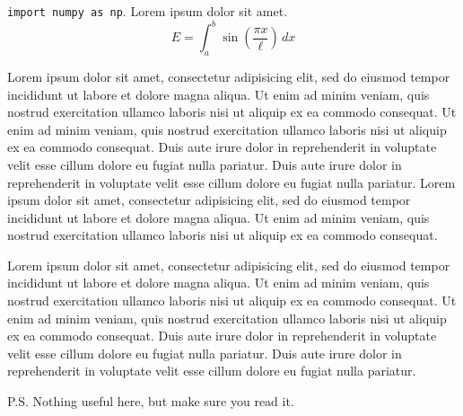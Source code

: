 \documentclass[uselibertine]{wade}
\date{30 February, 2020} %
\begin{document}

\printopening{}

\texttt{import numpy as np}. Lorem ipsum dolor sit amet.
\begin{equation}
    E = \int_a^b \sin\left(\frac{\pi x}{\ell}\right) \,dx
\end{equation}

Lorem ipsum dolor sit amet, consectetur adipisicing elit, sed do eiusmod tempor incididunt ut labore et dolore magna aliqua. Ut enim ad minim veniam, quis nostrud exercitation ullamco laboris nisi ut aliquip ex ea commodo consequat. Ut enim ad minim veniam, quis nostrud exercitation ullamco laboris nisi ut aliquip ex ea commodo consequat. Duis aute irure dolor in reprehenderit in voluptate velit esse cillum dolore eu fugiat nulla pariatur. Duis aute irure dolor in reprehenderit in voluptate velit esse cillum dolore eu fugiat nulla pariatur. Lorem ipsum dolor sit amet, consectetur adipisicing elit, sed do eiusmod tempor incididunt ut labore et dolore magna aliqua. Ut enim ad minim veniam, quis nostrud exercitation ullamco laboris nisi ut aliquip ex ea commodo consequat.

Lorem ipsum dolor sit amet, consectetur adipisicing elit, sed do eiusmod tempor incididunt ut labore et dolore magna aliqua. Ut enim ad minim veniam, quis nostrud exercitation ullamco laboris nisi ut aliquip ex ea commodo consequat. Ut enim ad minim veniam, quis nostrud exercitation ullamco laboris nisi ut aliquip ex ea commodo consequat. Duis aute irure dolor in reprehenderit in voluptate velit esse cillum dolore eu fugiat nulla pariatur. Duis aute irure dolor in reprehenderit in voluptate velit esse cillum dolore eu fugiat nulla pariatur.

\printclosing

P.S. Nothing useful here, but make sure you read it.
\end{document}
